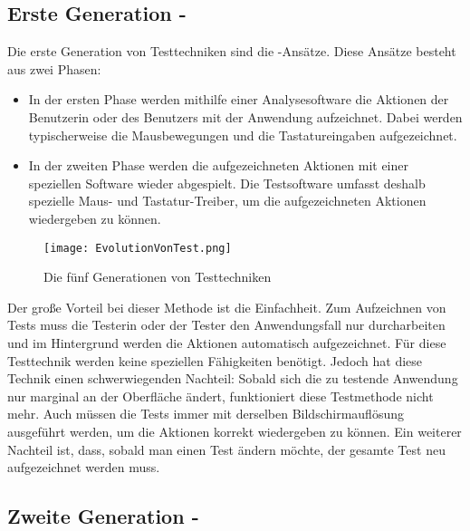 \subsection{Erste Generation - }

Die erste Generation von Testtechniken sind die -Ansätze. Diese Ansätze besteht aus zwei Phasen: \\

\begin{itemize}

\item In der ersten Phase werden mithilfe einer Analysesoftware die Aktionen der Benutzerin oder des Benutzers mit der Anwendung aufzeichnet. Dabei werden typischerweise die Mausbewegungen und die Tastatureingaben aufgezeichnet.\\

\item In der zweiten Phase werden die aufgezeichneten Aktionen mit einer speziellen Software wieder abgespielt. Die Testsoftware umfasst deshalb spezielle Maus- und Tastatur-Treiber, um die aufgezeichneten Aktionen wiedergeben zu können.\\

\end{itemize}

\begin{figure}[h]
\centering
\texttt{[image: EvolutionVonTest.png]}
\caption{Die fünf Generationen von Testtechniken}
\label{fig:testEvolution}
\end{figure}


\SuperPar
Der große Vorteil bei dieser Methode ist die Einfachheit. Zum Aufzeichnen von Tests muss die Testerin oder der Tester den Anwendungsfall nur durcharbeiten und im Hintergrund werden die Aktionen automatisch aufgezeichnet. Für diese Testtechnik werden keine speziellen Fähigkeiten benötigt. Jedoch hat diese Technik einen schwerwiegenden Nachteil: Sobald sich die zu testende Anwendung nur marginal an der Oberfläche ändert, funktioniert diese Testmethode nicht mehr. Auch müssen die Tests immer mit derselben Bildschirmauflösung ausgeführt werden, um die Aktionen korrekt wiedergeben zu können. Ein weiterer Nachteil ist, dass, sobald man einen Test ändern möchte, der gesamte Test neu aufgezeichnet werden muss.

\subsection{Zweite Generation - }

